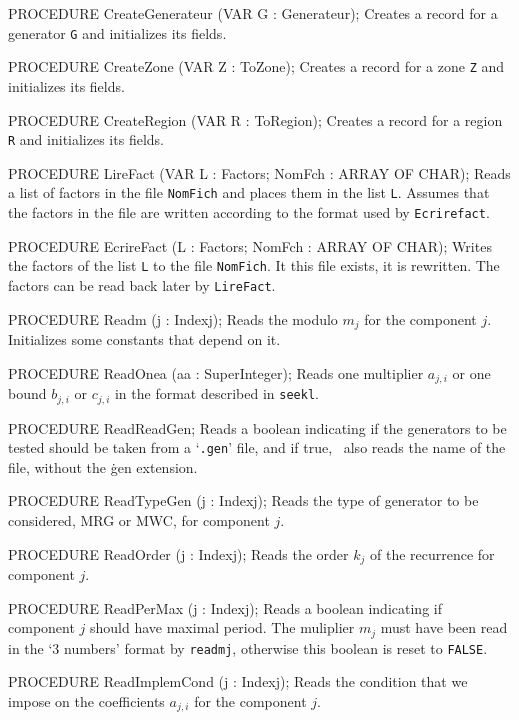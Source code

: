 PROCEDURE CreateGenerateur (VAR G : Generateur);
\endcode
 \tab 
  Creates a record for a generator {\tt G} and initializes its fields.
 \endtab
\code

PROCEDURE CreateZone (VAR Z : ToZone);
\endcode
 \tab 
  Creates a record for a zone {\tt Z} and initializes its  fields.
 \endtab
\code

PROCEDURE CreateRegion (VAR R : ToRegion);
\endcode
 \tab 
  Creates a record for a region {\tt R} and initializes its  fields.
 \endtab
\code

PROCEDURE LireFact (VAR L : Factors;   NomFch : ARRAY OF CHAR);
\endcode
 \tab
  Reads a list of factors in the file {\tt NomFich} and places them
  in the list {\tt L}.  Assumes that the factors in the file are
  written according to the format used by {\tt Ecrirefact}.
 \endtab
\code

PROCEDURE EcrireFact (L : Factors;   NomFch : ARRAY OF CHAR);
\endcode
 \tab
  Writes the factors of the list {\tt L} to the file {\tt NomFich}.
  It this file exists, it is rewritten.
  The factors can be read back later by {\tt LireFact}.
 \endtab
\code

PROCEDURE Readm (j : Indexj);
\endcode
 \tab
  Reads the modulo $m_j$ for the component $j$.
  Initializes some constants that depend on it.
 \endtab
\code

PROCEDURE ReadOnea (aa : SuperInteger);
\endcode
 \tab
  Reads one multiplier $a_{j,i}$ or one bound 
  $b_{j,i}$ or $c_{j,i}$ in the format described in {\tt seekl}.
 \endtab
\code

PROCEDURE ReadReadGen;
\endcode
 \tab
  Reads a boolean indicating if the generators to be tested should be
  taken from a `{\tt .gen}' file, and if true, \
  also reads the name of the file, without the {\.gen} extension.
 \endtab
\code

PROCEDURE ReadTypeGen (j : Indexj);
\endcode
 \tab
  Reads the type of generator to be considered, MRG or MWC,
  for component $j$.
 \endtab
\code

PROCEDURE ReadOrder (j : Indexj);
\endcode
 \tab
  Reads the order $k_j$ of the recurrence  for component $j$.
 \endtab
\code

PROCEDURE ReadPerMax (j : Indexj);
\endcode
 \tab
  Reads a boolean indicating if component $j$ should have 
  maximal period.  The muliplier $m_j$ must have been read in
  the `3 numbers' format by {\tt readmj}, otherwise this boolean
  is reset to {\tt FALSE}.
 \endtab
\code

PROCEDURE ReadImplemCond (j : Indexj);
\endcode
 \tab
  Reads the condition that we impose on the coefficients $a_{j,i}$
  for the component $j$.  
 \endtab
\code

